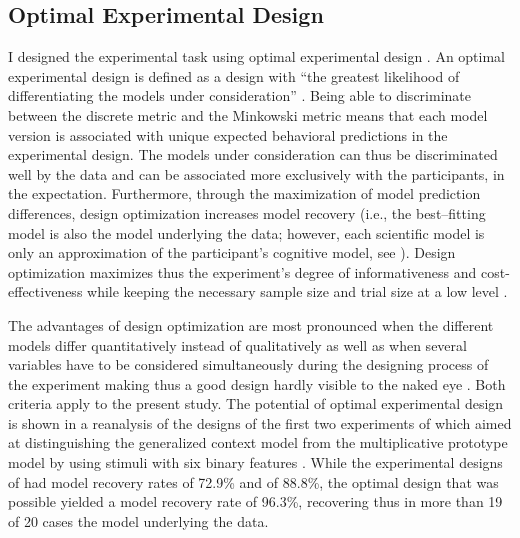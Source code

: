 \documentclass[a4paper,man,natbib]{apa6}
\begin{document}
\subsection{Optimal Experimental Design}
I designed the experimental task using optimal experimental design \citep{myung2009optimal}. An optimal experimental design is defined as a design with ``the greatest likelihood of differentiating the models under consideration'' \cite[][p. 500]{myung2009optimal}. Being able to discriminate between the discrete metric and the Minkowski metric means that each model version is associated with unique expected behavioral predictions in the experimental design. The models under consideration can thus be discriminated well by the data and can be associated more exclusively with the participants, in the expectation. Furthermore, through the maximization of model prediction differences, design optimization increases model recovery (i.e., the best--fitting model is also the model underlying the data; however, each scientific model is only an approximation of the participant's cognitive model, see \citealp{myung2009optimal}). 
Design optimization maximizes thus the experiment's degree of informativeness and cost-effectiveness while keeping the necessary sample size and trial size at a low level \citep{cavagnaro2009better, ouyang2016practical, raffert2012optimally, atkinson2007optimum, nelson2005finding}. 

The advantages of design optimization are most pronounced when the different models differ quantitatively instead of qualitatively as well as when several variables have to be considered simultaneously during the designing process of the experiment making thus a good design hardly visible to the naked eye \citep{myung2009optimal}. Both criteria apply to the present study.
The potential of optimal experimental design is shown in a reanalysis of the designs of the first two experiments of \cite{smith1998prototypes} which aimed at distinguishing the generalized context model \citep{nosofsky1986attention} from the multiplicative prototype model \citep{smith1998prototypes} by using stimuli with six binary features \citep{myung2009optimal}. While the experimental designs of \citeauthor{smith1998prototypes} had model recovery rates of 72.9\% and of 88.8\%, the optimal design that was possible yielded a model recovery rate of 96.3\%, recovering thus in more than 19 of 20 cases the model underlying the data.  
\end{document}
